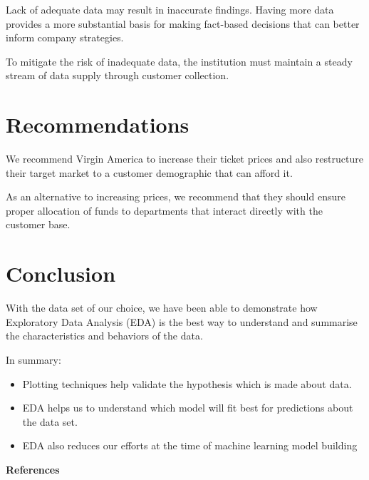 \documentclass[12pt,a4paper]{article}
\begin{document}
Lack of adequate data may result in inaccurate findings. Having more data provides a more substantial basis for making fact-based decisions that can better inform company strategies.

To mitigate the risk of inadequate data, the institution must maintain a steady stream of data supply through customer collection.

\section{Recommendations}

We recommend Virgin America to increase their ticket prices and also restructure their target market to a customer demographic that can afford it.

As an alternative to increasing prices, we recommend that they should ensure proper allocation of funds to departments that interact directly with the customer base. 

\section{Conclusion}

With the data set of our choice, we have been able to demonstrate how Exploratory Data Analysis (EDA) is the best way to understand and summarise the characteristics and behaviors of the data. 

In summary:

\begin{itemize}
\item Plotting techniques help validate the hypothesis which is made about data.
\item EDA helps us to understand which model will fit best for predictions about the data set.
\item EDA also reduces our efforts at the time of machine learning model building
\end{itemize}
 
\textbf{References}
\end{document}
